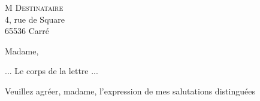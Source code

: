 \documentclass[12pt]{lettre}
\begin{document}
\begin{letter}{%
    M \textsc{Destinataire}\\
    4, rue de Square\\
    65536 Carré
}
\address{%
  M. Expéditeur\\
  27, rue du cube parfait\\
  19683 Huit}

\signature{Tar \textsc{Tempion}}


\opening{Madame,}

... Le corps de la lettre ...

\closing{Veuillez agréer, madame, 
  l'expression de mes salutations 
  distinguées}
\end{letter}
\end{document}
